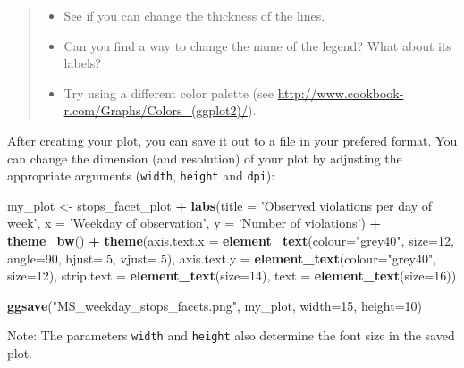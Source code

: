 \documentclass[]{book}
\newenvironment{Shaded}{\begin{snugshade}}{\end{snugshade}}
\newcommand{\DataTypeTok}[1]{\textcolor[rgb]{0.13,0.29,0.53}{#1}}
\newcommand{\DecValTok}[1]{\textcolor[rgb]{0.00,0.00,0.81}{#1}}
\newcommand{\KeywordTok}[1]{\textcolor[rgb]{0.13,0.29,0.53}{\textbf{#1}}}
\newcommand{\NormalTok}[1]{#1}
\newcommand{\OperatorTok}[1]{\textcolor[rgb]{0.81,0.36,0.00}{\textbf{#1}}}
\newcommand{\StringTok}[1]{\textcolor[rgb]{0.31,0.60,0.02}{#1}}
\providecommand{\tightlist}{%
  \setlength{\itemsep}{0pt}\setlength{\parskip}{0pt}}
\begin{document}
\begin{quote}
\begin{itemize}
\tightlist
\item
  See if you can change the thickness of the lines.
\item
  Can you find a way to change the name of the legend? What about its labels?
\item
  Try using a different color palette (see \url{http://www.cookbook-r.com/Graphs/Colors_(ggplot2)/}).
\end{itemize}
\end{quote}

After creating your plot, you can save it out to a file in your prefered format. You can change the dimension (and resolution) of your plot by adjusting the appropriate arguments (\texttt{width}, \texttt{height} and \texttt{dpi}):

\begin{Shaded}
\begin{Highlighting}[]
\NormalTok{my_plot <-}\StringTok{ }\NormalTok{stops_facet_plot }\OperatorTok{+}
\StringTok{  }\KeywordTok{labs}\NormalTok{(}\DataTypeTok{title =} \StringTok{'Observed violations per day of week'}\NormalTok{,}
         \DataTypeTok{x =} \StringTok{'Weekday of observation'}\NormalTok{,}
         \DataTypeTok{y =} \StringTok{'Number of violations'}\NormalTok{) }\OperatorTok{+}
\StringTok{  }\KeywordTok{theme_bw}\NormalTok{() }\OperatorTok{+}\StringTok{ }
\StringTok{  }\KeywordTok{theme}\NormalTok{(}\DataTypeTok{axis.text.x =} \KeywordTok{element_text}\NormalTok{(}\DataTypeTok{colour=}\StringTok{"grey40"}\NormalTok{, }\DataTypeTok{size=}\DecValTok{12}\NormalTok{, }\DataTypeTok{angle=}\DecValTok{90}\NormalTok{, }\DataTypeTok{hjust=}\NormalTok{.}\DecValTok{5}\NormalTok{, }\DataTypeTok{vjust=}\NormalTok{.}\DecValTok{5}\NormalTok{),}
        \DataTypeTok{axis.text.y =} \KeywordTok{element_text}\NormalTok{(}\DataTypeTok{colour=}\StringTok{"grey40"}\NormalTok{, }\DataTypeTok{size=}\DecValTok{12}\NormalTok{),}
        \DataTypeTok{strip.text =} \KeywordTok{element_text}\NormalTok{(}\DataTypeTok{size=}\DecValTok{14}\NormalTok{),}
        \DataTypeTok{text =} \KeywordTok{element_text}\NormalTok{(}\DataTypeTok{size=}\DecValTok{16}\NormalTok{))}

\KeywordTok{ggsave}\NormalTok{(}\StringTok{"MS_weekday_stops_facets.png"}\NormalTok{, my_plot, }\DataTypeTok{width=}\DecValTok{15}\NormalTok{, }\DataTypeTok{height=}\DecValTok{10}\NormalTok{)}
\end{Highlighting}
\end{Shaded}

Note: The parameters \texttt{width} and \texttt{height} also determine the font size in the saved plot.


\end{document}
